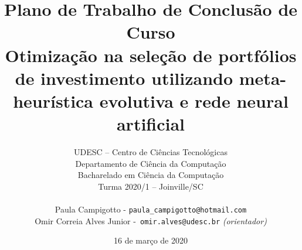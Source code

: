 \documentclass[11pt]{article}
\begin{document}
\pagestyle{fancy}

\title{
Plano de Trabalho de Conclusão de Curso \\
Otimização na seleção de portfólios de investimento utilizando meta-heurística evolutiva e rede neural artificial
}

\author{
UDESC -- Centro de Ciências Tecnológicas\\
Departamento de Ciência da Computação\\
Bacharelado em Ciência da Computação\\
Turma 2020/1 -- Joinville/SC\\
~\\

Paula Campigotto - \texttt{paula\_campigotto@hotmail.com}\\
Omir Correia Alves Junior -\texttt{ omir.alves@udesc.br} {\it (orientador)}\\

}

\date{16 de março de 2020}

\maketitle


\onehalfspacing  %
\end{document}
